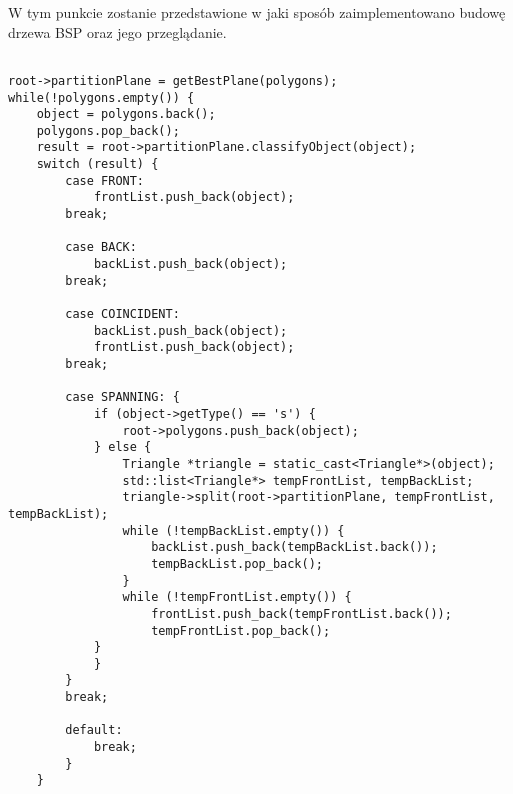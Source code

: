 W tym punkcie zostanie przedstawione w jaki sposób zaimplementowano budowę drzewa BSP oraz jego przeglądanie.

\begin{lstlisting}

root->partitionPlane = getBestPlane(polygons);
while(!polygons.empty()) {
    object = polygons.back();
    polygons.pop_back();
    result = root->partitionPlane.classifyObject(object);
    switch (result) {
        case FRONT:
            frontList.push_back(object);
        break;

        case BACK:
            backList.push_back(object);
        break;

        case COINCIDENT:
            backList.push_back(object);
            frontList.push_back(object);
        break;

        case SPANNING: {
            if (object->getType() == 's') {
                root->polygons.push_back(object);
            } else {
                Triangle *triangle = static_cast<Triangle*>(object);
                std::list<Triangle*> tempFrontList, tempBackList;
                triangle->split(root->partitionPlane, tempFrontList, tempBackList);
                while (!tempBackList.empty()) {
                    backList.push_back(tempBackList.back());
                    tempBackList.pop_back();
                }
                while (!tempFrontList.empty()) {
                    frontList.push_back(tempFrontList.back());
                    tempFrontList.pop_back();
            }
            }
        }
        break;

        default:
            break;
        }
    }
\end{lstlisting}

